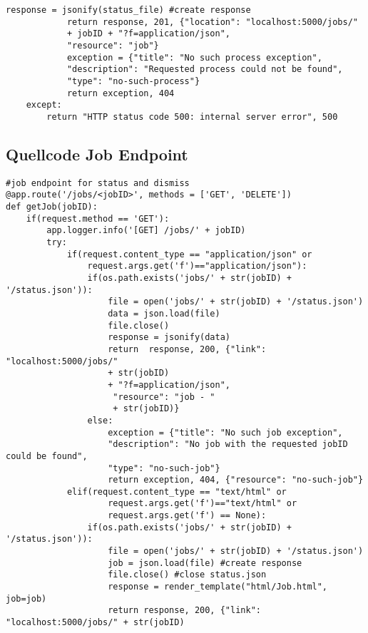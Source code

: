 \begin{lstlisting}[caption={Process Execution}, style = Python]
            response = jsonify(status_file) #create response
            return response, 201, {"location": "localhost:5000/jobs/" 
            + jobID + "?f=application/json", 
            "resource": "job"} 
            exception = {"title": "No such process exception", 
            "description": "Requested process could not be found", 
            "type": "no-such-process"}
            return exception, 404 
    except:
        return "HTTP status code 500: internal server error", 500
\end{lstlisting}\label{appendixProcessExecution}   

\newpage
\subsection{Quellcode Job Endpoint}
\begin{lstlisting}[caption={Job Endpoint}, style = Python]
#job endpoint for status and dismiss
@app.route('/jobs/<jobID>', methods = ['GET', 'DELETE']) 
def getJob(jobID):
    if(request.method == 'GET'):
        app.logger.info('[GET] /jobs/' + jobID)
        try:
            if(request.content_type == "application/json" or 
                request.args.get('f')=="application/json"): 
                if(os.path.exists('jobs/' + str(jobID) + '/status.json')):
                    file = open('jobs/' + str(jobID) + '/status.json')
                    data = json.load(file) 
                    file.close() 
                    response = jsonify(data) 
                    return  response, 200, {"link": "localhost:5000/jobs/" 
                    + str(jobID) 
                    + "?f=application/json",
                     "resource": "job - " 
                     + str(jobID)} 
                else:
                    exception = {"title": "No such job exception", 
                    "description": "No job with the requested jobID could be found", 
                    "type": "no-such-job"}
                    return exception, 404, {"resource": "no-such-job"} 
            elif(request.content_type == "text/html" or
                    request.args.get('f')=="text/html" or 
                    request.args.get('f') == None): 
                if(os.path.exists('jobs/' + str(jobID) + '/status.json')):
                    file = open('jobs/' + str(jobID) + '/status.json') 
                    job = json.load(file) #create response   
                    file.close() #close status.json
                    response = render_template("html/Job.html", job=job)
                    return response, 200, {"link": "localhost:5000/jobs/" + str(jobID) 

\end{lstlisting}
